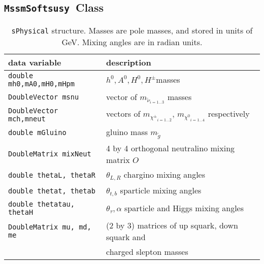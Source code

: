\documentclass[]{article}
\def\code#1{\small{\tt #1}\normalsize}
\begin{document}
\subsection{\code{MssmSoftsusy}~Class \label{sec:mssmsoftsusy}}

\begin{table}\begin{center}\begin{tabular}{ll}
data variable & description \\ \hline
\code{double mh0,mA0,mH0,mHpm} & $h^0, A^0, H^0,
H^\pm$masses \\
\code{DoubleVector msnu} & vector of $m_{{\tilde \nu}_{i=1 \ldots 3}}$ masses \\
\code{DoubleVector mch,mneut} & vectors of $m_{{\chi^\pm}_{i=1 \ldots 2}}$, 
$m_{{\chi^0}_{i=1 \ldots 4}}$ respectively \\
\code{double mGluino} & gluino mass $m_{\tilde g}$ \\
\code{DoubleMatrix mixNeut} & 4 by 4 orthogonal neutralino mixing matrix $O$
\\
\code{double thetaL, thetaR} & $\theta_{L, R}$ chargino mixing angles \\
\code{double thetat, thetab} & $\theta_{t,b}$ sparticle mixing angles \\
\code{double thetatau, thetaH} & $\theta_{\tau}, \alpha$ sparticle and Higgs
mixing angles \\
\code{DoubleMatrix mu, md, me} & (2 by 3) matrices of up squark, down squark
and\\
 &  charged slepton masses \\
\end{tabular}
\caption{ \label{tab:sphys}\code{sPhysical} structure. Masses are pole masses, and stored in units of
GeV. Mixing angles are in radian units.}\end{center}\end{table}
\end{document}
